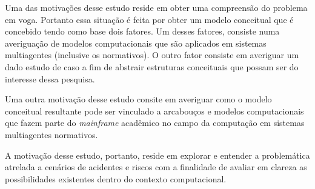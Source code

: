 Uma das motivações desse estudo reside em obter uma compreensão do problema em voga. Portanto essa situação é feita por obter um modelo conceitual que é concebido tendo como base dois fatores. Um desses fatores, consiste numa averiguação de modelos computacionais que são aplicados em sistemas multiagentes (inclusive os normativos). O outro fator consiste em averiguar um dado estudo de caso a fim de abstrair estruturas conceituais que possam ser do interesse dessa pesquisa.

Uma outra motivação desse estudo consite em averiguar como o modelo conceitual resultante pode ser vinculado a arcabouços e modelos computacionais que fazem parte do \textit{mainframe} acadêmico no campo da computação em sistemas multiagentes normativos.    

A motivação desse estudo, portanto, reside em explorar e entender a problemática atrelada a cenários de acidentes e riscos com a finalidade de avaliar em clareza as possibilidades existentes dentro do contexto computacional.